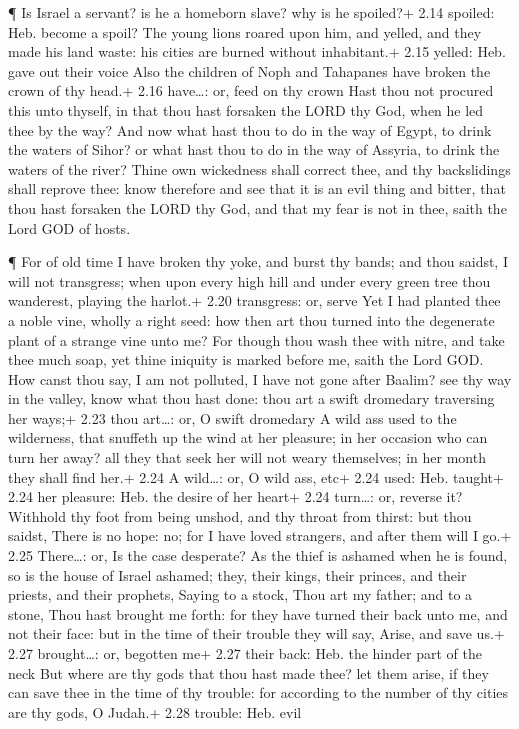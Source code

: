  ¶ Is Israel a servant? is he a homeborn slave? why is he
spoiled?+ 2.14 spoiled: Heb. become a spoil?  The young
lions roared upon him, and yelled, and they made his land waste: his
cities are burned without inhabitant.+ 2.15 yelled: Heb. gave out their
voice  Also the children of Noph and Tahapanes have broken
the crown of thy head.+ 2.16 have\ldots: or, feed on thy crown
 Hast thou not procured this unto thyself, in that thou
hast forsaken the LORD thy God, when he led thee by the way?
 And now what hast thou to do in the way of Egypt, to drink
the waters of Sihor? or what hast thou to do in the way of Assyria, to
drink the waters of the river?  Thine own wickedness shall
correct thee, and thy backslidings shall reprove thee: know therefore
and see that it is an evil thing and bitter, that thou hast forsaken the
LORD thy God, and that my fear is not in thee, saith the Lord GOD of
hosts.

 ¶ For of old time I have broken thy yoke, and burst thy
bands; and thou saidst, I will not transgress; when upon every high hill
and under every green tree thou wanderest, playing the harlot.+ 2.20
transgress: or, serve  Yet I had planted thee a noble vine,
wholly a right seed: how then art thou turned into the degenerate plant
of a strange vine unto me?  For though thou wash thee with
nitre, and take thee much soap, yet thine iniquity is marked before me,
saith the Lord GOD.  How canst thou say, I am not polluted,
I have not gone after Baalim? see thy way in the valley, know what thou
hast done: thou art a swift dromedary traversing her ways;+ 2.23 thou
art\ldots: or, O swift dromedary  A wild ass used to the
wilderness, that snuffeth up the wind at her pleasure; in her occasion
who can turn her away? all they that seek her will not weary themselves;
in her month they shall find her.+ 2.24 A wild\ldots: or, O wild ass,
etc+ 2.24 used: Heb. taught+ 2.24 her pleasure: Heb. the desire of her
heart+ 2.24 turn\ldots: or, reverse it?  Withhold thy foot
from being unshod, and thy throat from thirst: but thou saidst, There is
no hope: no; for I have loved strangers, and after them will I go.+ 2.25
There\ldots: or, Is the case desperate?  As the thief is
ashamed when he is found, so is the house of Israel ashamed; they, their
kings, their princes, and their priests, and their prophets,
 Saying to a stock, Thou art my father; and to a stone,
Thou hast brought me forth: for they have turned their back unto me, and
not their face: but in the time of their trouble they will say, Arise,
and save us.+ 2.27 brought\ldots: or, begotten me+ 2.27 their back: Heb.
the hinder part of the neck  But where are thy gods that
thou hast made thee? let them arise, if they can save thee in the time
of thy trouble: for according to the number of thy cities are thy gods,
O Judah.+ 2.28 trouble: Heb. evil

